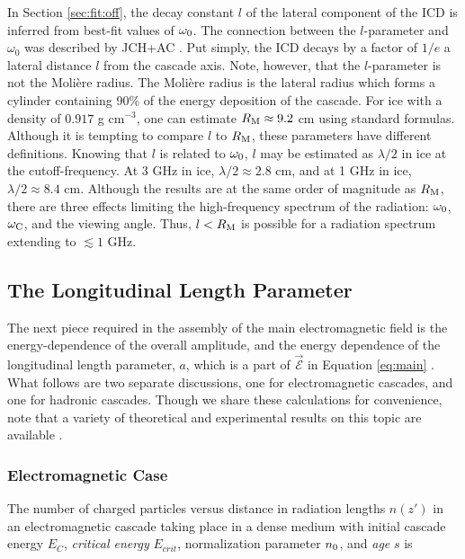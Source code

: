 \documentclass[amsmath,amssymb,aps,prd,10pt,twocolumn]{revtex4}
\begin{document}
In Section \ref{sec:fit:off}, the decay constant $l$ of the lateral component of the ICD is inferred from best-fit values of $\omega_{\rm 0}$.  The connection between the $l$-parameter and $\omega_0$ was described by JCH+AC \cite{10.1016/j.astropartphys.2017.03.008}.  Put simply, the ICD decays by a factor of $1/e$ a lateral distance $l$ from the cascade axis.  Note, however, that the $l$-parameter is not the Moli\`{e}re radius.  The Moli\`{e}re radius is the lateral radius which forms a cylinder containing 90\% of the energy deposition of the cascade.  For ice with a density of $0.917$ g cm$^{-3}$, one can estimate $R_{\rm M} \approx 9.2$ cm using standard formulas.  Although it is tempting to compare $l$ to $R_{\rm M}$, these parameters have different definitions. Knowing that $l$ is related to $\omega_{\rm 0}$, $l$ may be estimated as $\lambda/2$ in ice at the cutoff-frequency.  At 3 GHz in ice, $\lambda/2 \approx 2.8$ cm, and at 1 GHz in ice, $\lambda/2 \approx 8.4$ cm.  Although the results are at the same order of magnitude as $R_{\rm M}$, there are three effects limiting the high-frequency spectrum of the radiation: $\omega_{\rm 0}$, $\omega_{\rm C}$, and the viewing angle.  Thus, $l < R_{\rm M}$ is possible for a radiation spectrum extending to $\lesssim 1$ GHz.  

\subsection{The Longitudinal Length Parameter}
\label{sec:ff2}

The next piece required in the assembly of the main electromagnetic field is the energy-dependence of the overall amplitude, and the energy dependence of the longitudinal length parameter, $a$, which is a part of $\vec{\mathcal{E}}$ in Equation \ref{eq:main} \cite{10.1103/physrevd.65.016003}.  What follows are two separate discussions, one for electromagnetic cascades, and one for hadronic cascades.  Though we share these calculations for convenience, note that a variety of theoretical and experimental results on this topic are available \cite{saltzberg} \cite{ANDRINGA2011360} \cite{10.1088/1742-6596/1879/3/032089}.  

\subsubsection{Electromagnetic Case}

The number of charged particles versus distance in radiation lengths $n(z')$ in an electromagnetic cascade taking place in a dense medium with initial cascade energy $E_C$, \textit{critical energy} $E_{crit}$, normalization parameter $n_{\rm 0}$, and \textit{age} $s$ is \cite{10.1016/j.astropartphys.2017.03.008}
\end{document}
